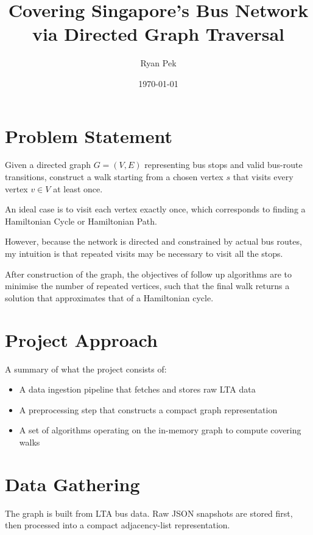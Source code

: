 \documentclass[11pt,a4paper]{article}
\title{Covering Singapore's Bus Network via Directed Graph Traversal}
\author{Ryan Pek}
\date{\today}
\begin{document}
\maketitle

\section{Problem Statement}

Given a directed graph $G=(V,E)$ representing bus stops and valid bus-route
transitions, construct a walk starting from a chosen vertex $s$ that visits
every vertex $v \in V$ at least once.

An ideal case is to visit each vertex exactly once, which corresponds to finding
a Hamiltonian Cycle or Hamiltonian Path.

However, because the network is directed and constrained by actual bus routes, 
my intuition is that repeated visits may be necessary to visit all the stops.

After construction of the graph, the objectives of follow up algorithms are
to minimise the number of repeated vertices, such that the final walk returns
a solution that approximates that of a Hamiltonian cycle.

\section{Project Approach}

A summary of what the project consists of:
\begin{itemize}
    \item A data ingestion pipeline that fetches and stores raw LTA data
    \item A preprocessing step that constructs a compact graph representation
    \item A set of algorithms operating on the in-memory graph to compute covering walks
\end{itemize}

\section{Data Gathering}

The graph is built from LTA bus data. Raw JSON snapshots are stored first, then
processed into a compact adjacency-list representation.
\end{document}
